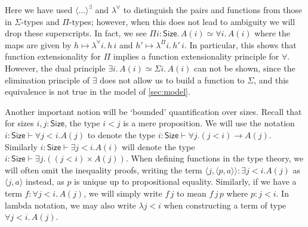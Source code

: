 \documentclass[10pt,a4paper]{article}
\theoremstyle{definition}
\theoremstyle{remark}
\renewcommand{\.}{.\,} %
\renewcommand{\:}{:} %
\newcommand{\Size}{\mathsf{Size}}
\newcommand{\0}{\mathbf{0}}
\newcommand{\1}{\mathbf{1}}
\newcommand\<\langle
\renewcommand\>\rangle
\theoremstyle{remark}
\begin{document}
Here we have used \(\<\dots\>^\exists\) and \(\lambda^\forall\) to distinguish the pairs and functions from those in \(\Sigma\)-types and \(\Pi\)-types; however, when this does not lead to ambiguity we will drop these superscripts.
In fact, we see \(\Pi i:\Size.\,A(i) \simeq \forall i.\,A(i) \) where the maps are given by \(h\mapsto\lambda^\forall i.\,h\,i\) and \(h'\mapsto\lambda^\Pi i.\,h'\,i\).
In particular, this shows that function extensionality for \(\Pi\) implies a function extensionality principle for \(\forall\).
However, the dual principle \(\exists i.\,A(i)\simeq\Sigma i.\,A(i)\) can not be shown, since the elimination principle of \(\exists\) does not allow us to build a function to \(\Sigma\), and this equivalence is not true in the model of \autoref{sec:model}.


Another important notion will be `bounded' quantification over sizes.
Recall that for sizes \( i, j : \Size \), the type \( i < j \) is a mere proposition. We will use the notation $i : \Size \vdash \forall j < i. A(j)$ to denote the type $i : \Size \vdash \forall j. (j < i) \to A(j)$. Similarly $i : \Size \vdash \exists j < i. A(i)$ will denote the type $i : \Size \vdash \exists j. ((j < i) \times A(j))$. When defining functions in the type theory, we will often omit the inequality proofs, writing the term $\langle j, \langle p, a \rangle \rangle : \exists j < i. A(j)$ as $\langle j, a\rangle $ instead, as \( p \) is unique up to propositional equality. Similarly, if we have a term $f : \forall j < i \. A(j)$, we will simply write $f \, j$ to mean $f \, j \, p$ where $p: j < i$. In lambda notation, we may also write $\lambda j < i$ when constructing a term of type $\forall j < i\. A(j)$. 
\end{document}
